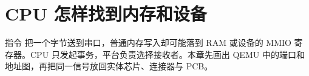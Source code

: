 \chapter{CPU 怎样找到内存和设备}

指令  把一个字节送到串口，普通内存写入却可能落到 RAM
或设备的 MMIO 寄存器。CPU 只发起事务，平台负责选择接收者。本章先画出 QEMU
中的端口和地址图，再把同一信号放回实体芯片、连接器与 PCB。





